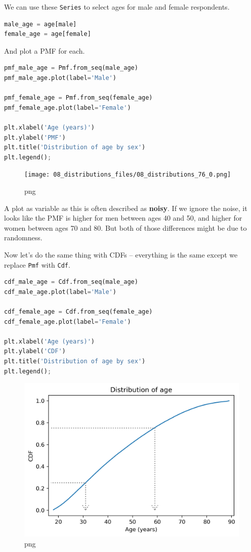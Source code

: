 \documentclass[
]{book}
\newcommand{\passthrough}[1]{#1}
\begin{document}
We can use these \passthrough{\lstinline!Series!} to select ages for
male and female respondents.

\begin{lstlisting}[language=Python]
male_age = age[male]
female_age = age[female]
\end{lstlisting}

And plot a PMF for each.

\begin{lstlisting}[language=Python]
pmf_male_age = Pmf.from_seq(male_age)
pmf_male_age.plot(label='Male')

pmf_female_age = Pmf.from_seq(female_age)
pmf_female_age.plot(label='Female')

plt.xlabel('Age (years)') 
plt.ylabel('PMF')
plt.title('Distribution of age by sex')
plt.legend();
\end{lstlisting}

\begin{figure}
\centering
\texttt{[image: 08\_distributions\_files/08\_distributions\_76\_0.png]}
\caption{png}
\end{figure}

A plot as variable as this is often described as \textbf{noisy}. If we
ignore the noise, it looks like the PMF is higher for men between ages
40 and 50, and higher for women between ages 70 and 80. But both of
those differences might be due to randomness.

Now let's do the same thing with CDFs -- everything is the same except
we replace \passthrough{\lstinline!Pmf!} with
\passthrough{\lstinline!Cdf!}.

\begin{lstlisting}[language=Python]
cdf_male_age = Cdf.from_seq(male_age)
cdf_male_age.plot(label='Male')

cdf_female_age = Cdf.from_seq(female_age)
cdf_female_age.plot(label='Female')

plt.xlabel('Age (years)') 
plt.ylabel('CDF')
plt.title('Distribution of age by sex')
plt.legend();
\end{lstlisting}

\begin{figure}
\centering
\includegraphics{08_distributions_files/08_distributions_78_0.png}
\caption{png}
\end{figure}
\end{document}
